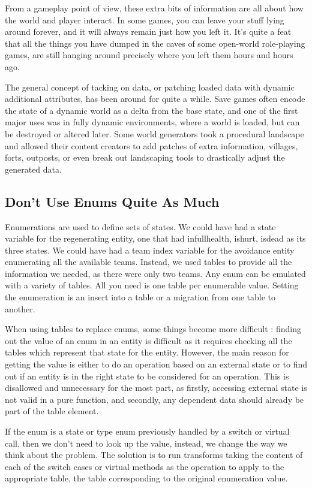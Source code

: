 \documentclass[a4paper,12pt]{book}
\begin{document}
From a gameplay point of view, these extra bits of information are all about how the world and player interact.
In some games, you can leave your stuff lying around forever, and it will always remain just how you left it.
It's quite a feat that all the things you have dumped in the caves of some open-world role-playing games, are still hanging around precisely where you left them hours and hours ago.

The general concept of tacking on data, or patching loaded data with dynamic additional attributes, has been around for quite a while.
Save games often encode the state of a dynamic world as a delta from the base state, and one of the first major uses was in fully dynamic environments, where a world is loaded, but can be destroyed or altered later.
Some world generators took a procedural landscape and allowed their content creators to add patches of extra information, villages, forts, outposts, or even break out landscaping tools to drastically adjust the generated data.

\subsection{Don't Use Enums Quite As Much}

Enumerations are used to define sets of states.
We could have had a state variable for the regenerating entity, one that had infullhealth, ishurt, isdead as its three states.
We could have had a team index variable for the avoidance entity enumerating all the available teams.
Instead, we used tables to provide all the information we needed, as there were only two teams.
Any enum can be emulated with a variety of tables.
All you need is one table per enumerable value.
Setting the enumeration is an insert into a table or a migration from one table to another.

When using tables to replace enums, some things become more difficult :
finding out the value of an enum in an entity is difficult as it requires checking all the tables which represent that state for the entity.
However, the main reason for getting the value is either to do an operation based on an external state or to find out if an entity is in the right state to be considered for an operation.
This is disallowed and unnecessary for the most part, as firstly, accessing external state is not valid in a pure function, and secondly, any dependent data should already be part of the table element.

If the enum is a state or type enum previously handled by a switch or virtual call, then we don't need to look up the value, instead, we change the way we think about the problem.
The solution is to run transforms taking the content of each of the switch cases or virtual methods as the operation to apply to the appropriate table, the table corresponding to the original enumeration value.
\end{document}

